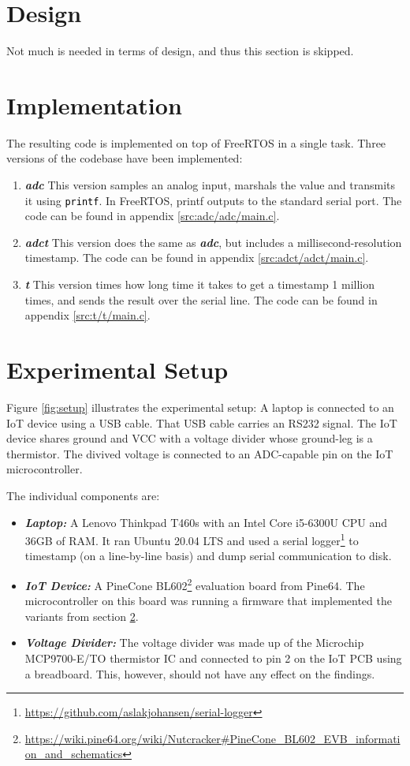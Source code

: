 \documentclass[a4paper]{article}
\newcommand{\textdesc}[1]{\textit{\textbf{#1}}}
\newcommand{\descitem}[1]{\item \textdesc{#1}}
\newcommand{\funcname}[1]{\texttt{\textcolor{black}{#1}}}
\begin{document}
\section{Design}

Not much is needed in terms of design, and thus this section is skipped.

\section{Implementation}
\label{sec:implementation}

The resulting code is implemented on top of FreeRTOS in a single task. Three versions of the codebase have been implemented:
\begin{enumerate}
  \descitem{adc} This version samples an analog input, marshals the value and transmits it using \funcname{printf}. In FreeRTOS, printf outputs to the standard serial port. The code can be found in appendix \ref{src:adc/adc/main.c}.
  \descitem{adct} This version does the same as \textdesc{adc}, but includes a millisecond-resolution timestamp. The code can be found in appendix \ref{src:adct/adct/main.c}.
  \descitem{t} This version times how long time it takes to get a timestamp 1 million times, and sends the result over the serial line. The code can be found in appendix \ref{src:t/t/main.c}.
\end{enumerate}

\section{Experimental Setup}

Figure \ref{fig:setup} illustrates the experimental setup: A laptop is connected to an IoT device using a USB cable. That USB cable carries an RS232 signal. The IoT device shares ground and VCC with a voltage divider whose ground-leg is a thermistor. The divived voltage is connected to an ADC-capable pin on the IoT microcontroller.

The individual components are:
\begin{itemize}
  \descitem{Laptop:} A Lenovo Thinkpad T460s with an Intel Core i5-6300U CPU and 36GB of RAM. It ran Ubuntu 20.04 LTS and used a serial logger\footnote{\url{https://github.com/aslakjohansen/serial-logger}} to timestamp (on a line-by-line basis) and dump serial communication to disk.
  \descitem{IoT Device:} A PineCone BL602\footnote{\url{https://wiki.pine64.org/wiki/Nutcracker\#PineCone_BL602\_EVB\_information\_and\_schematics}} evaluation board from Pine64. The microcontroller on this board was running a firmware that implemented the variants from section \ref{sec:implementation}.
  \descitem{Voltage Divider:} The voltage divider was made up of the Microchip MCP9700-E/TO thermistor IC and connected to pin 2 on the IoT PCB using a breadboard. This, however, should not have any effect on the findings.
\end{itemize}
\end{document}
